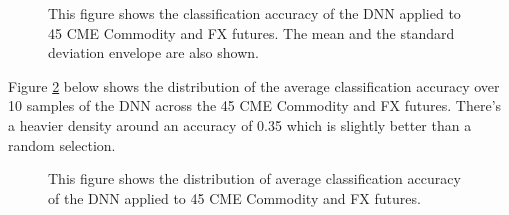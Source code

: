 \documentclass{article}
\begin{document}
\begin{figure}[H]
	\caption{This figure shows the classification accuracy of the DNN applied to 45 CME Commodity and FX futures. The mean and the standard deviation envelope are also shown.}
	\label{fig:classification}
\end{figure}


Figure \ref{fig:classification_accu} below shows the distribution of the average classification accuracy over 10 samples of the DNN across the 45 CME Commodity and FX futures. There's a heavier density around an accuracy of 0.35 which is slightly better than a random selection.

\begin{figure}[H]
	\caption{This figure shows the distribution of average classification accuracy of the DNN applied to 45 CME Commodity and FX futures.}
	\label{fig:classification_accu}
\end{figure}
\end{document}
